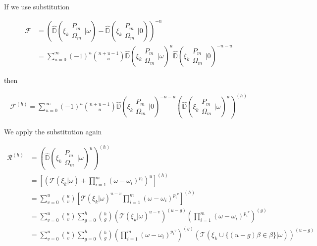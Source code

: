If we use substitution 

\begin{align}
\mathcal{F} &= \left(\hat{\mathbb{D}}\left( \xi_k \begin{matrix} P_m \\
\Omega_m \end{matrix} \bigg| \omega \right) - \hat{\mathbb{D}}\left( 
\xi_k \begin{matrix} P_m \\ \Omega_m \end{matrix} \bigg| 0 \right)\right)^{-n} \\
&= \sum_{u=0}^\infty (-1)^u \binom{n + u - 1}{u} \hat{\mathbb{D}}\left( \xi_k
\begin{matrix} P_m \\ \Omega_m \end{matrix} \bigg| \omega \right)^u  
\hat{\mathbb{D}}\left( \xi_k \begin{matrix} P_m \\ \Omega_m \end{matrix}
\bigg| 0 \right)^{-n-u}
\end{align}

then

\begin{align}
\mathcal{F}^{(h)} = \sum_{u=0}^\infty (-1)^u \binom{n + u - 1}{u}  
\hat{\mathbb{D}}\left( \xi_k \begin{matrix} P_m \\ \Omega_m \end{matrix}
\bigg| 0 \right)^{-n-u} \left( \hat{\mathbb{D}}\left( \xi_k \begin{matrix}
P_m \\ \Omega_m \end{matrix} \bigg| \omega \right)^u\right)^{(h)}
\end{align}

We apply the substitution again

\begin{align}
        \mathcal{R}^{(h)} &=  \left( \hat{\mathbb{D}}\left( \xi_k \begin{matrix} P_m 
        \\ \Omega_m \end{matrix} \bigg| \omega \right)^u\right)^{(h)} \\
        &= \left[\left(\mathcal{T}(\xi_k | \omega) + \prod_{i=1}^m (\omega - 
        \omega_i)^{p_i}\right)^u\right]^{(h)} \\
        &= \sum_{v=0}^u \binom{u}{v} \left[\mathcal{T}(\xi_k | \omega)^{u-v}
        \prod_{i=1}^m (\omega - \omega_i)^{p_i}^{v}\right]^{(h)} \\
        &= \sum_{v=0}^u \binom{u}{v} \sum_{g=0}^h \binom{h}{g} \left(\mathcal{T}
        (\xi_k | \omega)^{u-v} \right)^{(u-g)} \left(\prod_{i=1}^m (\omega -
        \omega_i)^{p_i}^{v} \right)^{(g)} \\
        &= \sum_{v=0}^u \binom{u}{v} \sum_{g=0}^h \binom{h}{g}  
        \left(\prod_{i=1}^m (\omega - \omega_i)^{p_i}^{v} \right)^{(g)} 
        \left(\mathcal{T}(\xi_k \cup \{ (u-g) \beta \in \beta\} | \omega) \right)^{(u-g)} 
\end{align}

